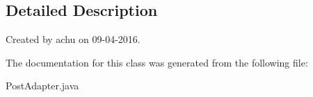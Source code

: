 \subsection{\-Detailed \-Description}
\-Created by achu on 09-\/04-\/2016. 

\-The documentation for this class was generated from the following file\-:\begin{DoxyCompactItemize}
\item 
\-Post\-Adapter.\-java\end{DoxyCompactItemize}
